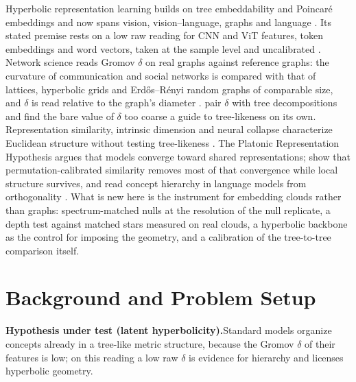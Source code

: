 \documentclass{article}
\theoremstyle{definition}
\begin{document}
Hyperbolic representation learning builds on tree embeddability and Poincar\'{e} embeddings and now spans vision, vision--language, graphs and language \citep{sarkar2011low, nickel2017poincare, ganea2018hyperbolic, chami2019hyperbolic}. Its stated premise rests on a low raw reading for CNN and ViT features, token embeddings and word vectors, taken at the sample level and uncalibrated \citep{Khrulkov_2020_CVPR, bdeir2024fully, yang2025hyperbolic, tifrea2019poincare}. Network science reads Gromov $\delta$ on real graphs against reference graphs: the curvature of communication and social networks is compared with that of lattices, hyperbolic grids and Erd\H{o}s--R\'{e}nyi random graphs of comparable size, and $\delta$ is read relative to the graph's diameter \citep{narayan2011curvature, kennedy2013hyperbolicity}. \citet{adcock2013treelike} pair $\delta$ with tree decompositions and find the bare value of $\delta$ too coarse a guide to tree-likeness on its own. Representation similarity, intrinsic dimension and neural collapse characterize Euclidean structure without testing tree-likeness \citep{kornblith2019cka, ansuini2019intrinsic, pope2021intrinsic, papyan2020prevalence}. The Platonic Representation Hypothesis argues that models converge toward shared representations; \citet{groger2026aristotelian} show that permutation-calibrated similarity removes most of that convergence while local structure survives, and \citet{park2024geometry} read concept hierarchy in language models from orthogonality \citep{huh2024platonic, koepke2026cave}. What is new here is the instrument for embedding clouds rather than graphs: spectrum-matched nulls at the resolution of the null replicate, a depth test against matched stars measured on real clouds, a hyperbolic backbone as the control for imposing the geometry, and a calibration of the tree-to-tree comparison itself.

\section{Background and Problem Setup}
\label{sec:setup}

\begin{shaded}
\textbf{Hypothesis under test (latent hyperbolicity).}\quad Standard models organize concepts already in a tree-like metric structure, because the Gromov $\delta$ of their features is low; on this reading a low raw $\delta$ is evidence for hierarchy and licenses hyperbolic geometry.
\end{shaded}
\end{document}
